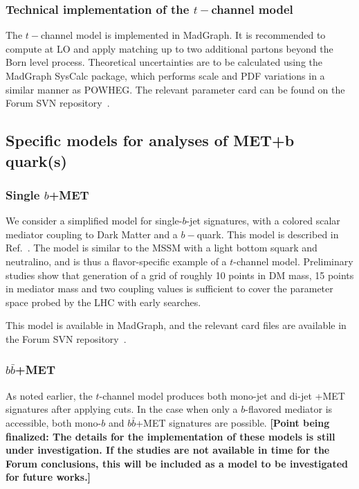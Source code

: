 \documentclass[a4,debug,notitlepage,nobib]{tufte-handout}
\begin{document}
\subsubsection{Technical implementation of the $t-$channel model} 

The $t-$channel model is implemented in MadGraph. 
It is recommended
to compute at LO and apply matching up to two additional partons
beyond the Born level
process. Theoretical uncertainties are to be calculated using
the MadGraph SysCalc package, which performs scale and PDF variations
in a similar manner as POWHEG.
The relevant parameter card can be found on the Forum
SVN repository~\cite{ForumSVN_TChannel}. 

\subsection{Specific models for analyses of MET+b quark(s)}

\subsubsection{Single $b$+MET}

We consider a simplified model for single-$b$-jet signatures, 
with a colored scalar mediator coupling to Dark Matter and a $b-$quark. 
This model is described in Ref.~\cite{Agrawal:2014una}. 
The model is similar to the MSSM
with a light bottom squark and neutralino, and is thus a flavor-specific
example of a $t$-channel model. 
Preliminary studies 
show that generation of a grid of roughly 10 points in DM mass, 15 points in mediator
mass and two coupling values is sufficient to cover the parameter
space probed by the LHC with early searches. 

This model is available in MadGraph, and the relevant card files are 
available in the Forum SVN repository~\cite{ForumSVN_DMSingleB}.

\subsubsection{$b \bar{b}$+MET}

As noted earlier, the $t$-channel model produces both mono-jet and
di-jet +MET signatures after applying cuts.  In the case when
only a $b$-flavored mediator is accessible, both mono-$b$ and
$b\bar b$+MET
signatures are possible. 
\textbf{[Point being finalized: The details for the implementation of these
models is still under investigation. If the studies are not available in
time for the Forum conclusions, this will be included as a model to be 
investigated for future works.]}
\end{document}
